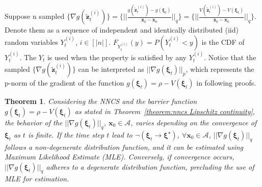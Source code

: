 \documentclass[conference]{IEEEtran}
\newtheorem{theorem}{\bf Theorem}
\newcommand{\nncs}{\textsc{NNCS}\xspace}
\newcommand{\mle}{\textsc{MLE}\xspace}
\newcommand{\myvec}[1]{\boldsymbol{#1}}
\newcommand{\calA}{\mathcal{A}}
\newcommand{\bbB}{\mathbb{B}}
\begin{document}
Suppose n sampled 
$  \{\nabla g(\tilde{\myvec{z}}_{t}^{(i)})\} = 
\{||\frac{g(\tilde{\myvec{z}}_{t}^{(i)}) - g(\myvec{\xi}_{t})}
{\myvec{z}_{0} - \myvec{x}_{0}}||_{q}\} 
= \{||\frac{V(\tilde{\myvec{z}}_{t}^{(i)}) - V(\myvec{\xi}_{t})}
{\myvec{z}_{0} - \myvec{x}_{0}}||_{q}\}$. Denote them 
as a sequence of independent and identically distributed (iid) 
random variables $Y^{(i)}_{t}$, $i \in [|n|]$. 
$F_{Y^{(i)}_{t}}(y) = P(Y^{(i)}_{t} < y)$ is the CDF of $Y^{(i)}_{t}$. 
The $Y_{t}$ is used when the property is satisfied by any $Y^{(i)}_{t}$. 
Notice that the sampled 
$\{\nabla g(\tilde{\myvec{z}}_{t}^{(i)})\}$ 
can be interpreted as 
$||\nabla g(\myvec{\xi}_{t})||_{p}$, which represents 
the p-norm of the gradient of 
the function 
$g(\myvec{\xi}_{t}) = \rho - V(\myvec{\xi}_{t})$ 
in following proofs.

\begin{theorem}\label{theorem:different distributions}
  Considering the \nncs and the barrier function 
  $g(\myvec{\xi}_{t}) = \rho - V(\myvec{\xi}_{t})$ as stated in 
  Theorem~\ref{theorem:nncs Lipschitz continuity}, 
  the behavior of the $||\nabla g(\myvec{\xi}_{t})||_{q}$, 
  $\myvec{x}_{0} \in \calA$, 
  varies depending on the convergence of $\myvec{\xi}_{t}$ 
  as $t$ is finite. 
  If the time step $t$ lead to $\lnot(\myvec{\xi}_{t} \to \myvec{\xi}^{\star})$, 
  $\forall \myvec{x}_{0} \in \calA$, 
  $||\nabla g(\myvec{\xi}_{t})||_{q}$ 
  follows a non-degenerate distribution function, 
  and it can be estimated using Maximum Likelihood Estimate (\mle). 
  Conversely, if convergence occurs, $||\nabla g(\myvec{\xi}_{t})||_{q}$ 
  adheres to a degenerate distribution function, precluding 
  the use of MLE for estimation.

\end{theorem}
\end{document}
